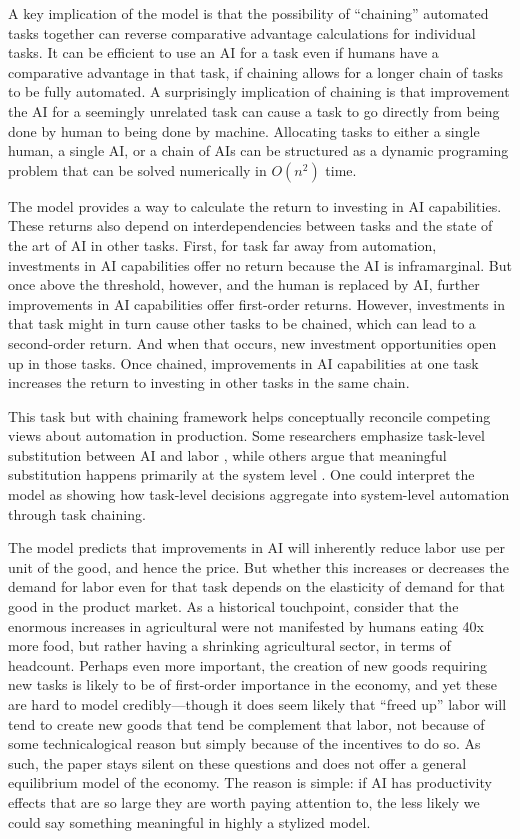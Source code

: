 \documentclass{article}
\begin{document}
A key implication of the model is that the possibility of ``chaining'' automated tasks together can reverse comparative advantage calculations for individual tasks.
It can be efficient to use an AI for a task even if humans have a comparative advantage in that task, if chaining allows for a longer chain of tasks to be fully automated.
A surprisingly implication of chaining is that improvement the AI for a seemingly unrelated task can cause a task to go directly from being done by human to being done by machine.
Allocating tasks to either a single human, a single AI, or a chain of AIs can be structured as a dynamic programing problem that can be solved numerically in $O(n^2)$ time.

The model provides a way to calculate the return to investing in AI capabilities. 
These returns also depend on interdependencies between tasks and the state of the art of AI in other tasks.
First, for task far away from automation, investments in AI capabilities offer no return because the AI is inframarginal.
But once above the threshold, however, and the human is replaced by AI, further improvements in AI capabilities offer first-order returns. 
However, investments in that task might in turn cause other tasks to be chained, which can lead to a second-order return.
And when that occurs, new investment opportunities open up in those tasks.
Once chained, improvements in AI capabilities at one task increases the return to investing in other tasks in the same chain.

This task but with chaining framework helps conceptually reconcile competing views about automation in production. 
Some researchers emphasize task-level substitution between AI and labor \citep{autor2003skill, acemoglu2018automation}, while others argue that meaningful substitution happens primarily at the system level \citep{bresnahan2020artificial}. 
One could interpret the model as showing how task-level decisions aggregate into system-level automation through task chaining.

The model predicts that improvements in AI will inherently reduce labor use per unit of the good, and hence the price. 
But whether this increases or decreases the demand for labor even for that task depends on the elasticity of demand for that good in the product market.
As a historical touchpoint, consider that the enormous increases in agricultural were not manifested by humans eating 40x more food, but rather having a shrinking agricultural sector, in terms of headcount.
Perhaps even more important, the creation of new goods requiring new tasks is likely to be of first-order importance in the economy, and yet these are hard to model credibly---though it does seem likely that ``freed up'' labor will tend to create new goods that tend be complement that labor, not because of some technicalogical reason but simply because of the incentives to do so.
As such, the paper stays silent on these questions and does not offer a general equilibrium model of the economy.
The reason is simple: if AI has productivity effects that are so large they are worth paying attention to, the less likely we could say something meaningful in highly a stylized model.
\end{document}
